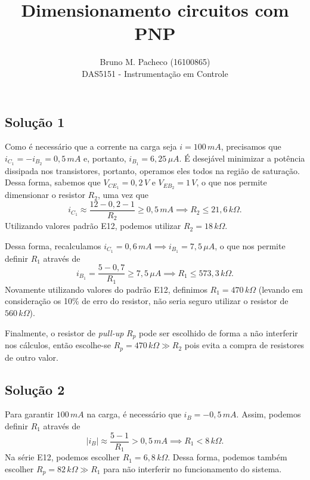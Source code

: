 \documentclass[a4paper]{report}
\begin{document}
 
\title{Dimensionamento circuitos com PNP}
\author{Bruno M. Pacheco (16100865)\\
DAS5151 - Instrumentação em Controle}
 
\maketitle
 
\subsection*{Solução 1}

Como é necessário que a corrente na carga seja $i=100\,mA$, precisamos que $i_{C_1}= -i_{B_2}=0,5\,mA$ e, portanto, $i_{B_1} = 6,25\,\mu A$. É desejável minimizar a potência dissipada nos transistores, portanto, operamos eles todos na região de saturação. Dessa forma, sabemos que $V_{CE_1} = 0,2\,V$ e $V_{EB_2} = 1\,V$, o que nos permite dimensionar o resistor $R_2$, uma vez que \[
i_{C_1} \approx \frac{12-0,2 - 1}{R_2} \ge 0,5\,mA \implies R_2 \le 21,6\,k\Omega
.\] Utilizando valores padrão E12, podemos utilizar $R_2=18\,k\Omega$.

Dessa forma, recalculamos $i_{C_1} = 0,6\,mA \implies i_{B_1} = 7,5\,\mu A$, o que nos permite definir $R_1$ através de \[
i_{B_1} = \frac{5-0,7}{R_1} \ge 7,5\,\mu A \implies R_1 \le 573,3\,k\Omega
.\] Novamente utilizando valores do padrão E12, definimos $R_1 = 470\,k\Omega$ (levando em consideração os 10\% de erro do resistor, não seria seguro utilizar o resistor de $560\,k\Omega$).

Finalmente, o resistor de \emph{pull-up} $R_p$ pode ser escolhido de forma a não interferir nos cálculos, então escolhe-se $R_p = 470\,k\Omega \gg R_2$ pois evita a compra de resistores de outro valor.

\subsection*{Solução 2}

Para garantir $100\,mA$ na carga, é necessário que $i_{B} = -0,5\,mA$. Assim, podemos definir $R_1$ através de \[
|i_{B}| \approx \frac{5-1}{R_1} > 0,5\,mA \implies R_1 < 8\,k\Omega
.\] Na série E12, podemos escolher $R_1 = 6,8\,k\Omega$. Dessa forma, podemos também escolher $R_p =  82\,k\Omega \gg R_1$ para não interferir no funcionamento do sistema.
\end{document}
